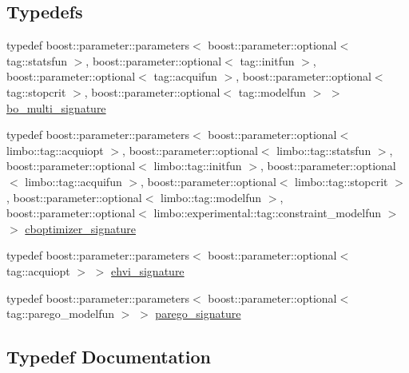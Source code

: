 \subsection*{Typedefs}
\begin{DoxyCompactItemize}
\item 
typedef boost\+::parameter\+::parameters$<$ boost\+::parameter\+::optional$<$ tag\+::statsfun $>$, boost\+::parameter\+::optional$<$ tag\+::initfun $>$, boost\+::parameter\+::optional$<$ tag\+::acquifun $>$, boost\+::parameter\+::optional$<$ tag\+::stopcrit $>$, boost\+::parameter\+::optional$<$ tag\+::modelfun $>$ $>$ \hyperlink{namespacelimbo_1_1experimental_1_1bayes__opt_a917a3d4ba3c92a91c3664f9e3ab91057}{bo\+\_\+multi\+\_\+signature}
\item 
typedef boost\+::parameter\+::parameters$<$ boost\+::parameter\+::optional$<$ limbo\+::tag\+::acquiopt $>$, boost\+::parameter\+::optional$<$ limbo\+::tag\+::statsfun $>$, boost\+::parameter\+::optional$<$ limbo\+::tag\+::initfun $>$, boost\+::parameter\+::optional$<$ limbo\+::tag\+::acquifun $>$, boost\+::parameter\+::optional$<$ limbo\+::tag\+::stopcrit $>$, boost\+::parameter\+::optional$<$ limbo\+::tag\+::modelfun $>$, boost\+::parameter\+::optional$<$ limbo\+::experimental\+::tag\+::constraint\+\_\+modelfun $>$ $>$ \hyperlink{namespacelimbo_1_1experimental_1_1bayes__opt_a5b88cfb36e71acb407ac2258966e57b1}{cboptimizer\+\_\+signature}
\item 
typedef boost\+::parameter\+::parameters$<$ boost\+::parameter\+::optional$<$ tag\+::acquiopt $>$ $>$ \hyperlink{namespacelimbo_1_1experimental_1_1bayes__opt_aa9273d3d9c89937c8da1850d0174d3ff}{ehvi\+\_\+signature}
\item 
typedef boost\+::parameter\+::parameters$<$ boost\+::parameter\+::optional$<$ tag\+::parego\+\_\+modelfun $>$ $>$ \hyperlink{namespacelimbo_1_1experimental_1_1bayes__opt_aa1bdc78504860120d6bc0f395f986f57}{parego\+\_\+signature}
\end{DoxyCompactItemize}


\subsection{Typedef Documentation}
\hypertarget{namespacelimbo_1_1experimental_1_1bayes__opt_a917a3d4ba3c92a91c3664f9e3ab91057}{}

